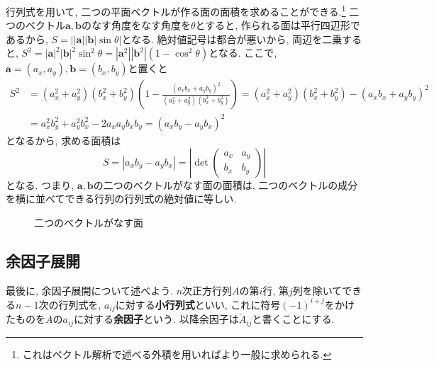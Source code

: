         行列式を用いて, 二つの平面ベクトルが作る面の面積を求めることができる.\footnote{これはベクトル解析で述べる外積を用いればより一般に求められる.} 二つのベクトル$\bm{a},\bm{b}$のなす角度をなす角度を$\theta$とすると, 
        作られる面は平行四辺形であるから, $S=\left||\bm{a}||\bm{b}|\sin\theta\right|$となる. 絶対値記号は都合が悪いから, 両辺を二乗すると,
        $S^2=|\bm{a}|^2|\bm{b}|^2\sin^2\theta=|\bm{a}^2||\bm{b}^2|(1-\cos^2\theta)$となる.
        ここで, $\bm{a}=(a_x,a_y),\bm{b}=(b_x,b_y)$と置くと
        \begin{align*}
            S^2&=(a_x^2+a_y^2)(b_x^2+b_y^2)\left(1-\frac{(a_xb_x+a_yb_y)^2}{(a_x^2+a_y^2)(b_x^2+b_y^2)}\right)=(a_x^2+a_y^2)(b_x^2+b_y^2)-(a_xb_x+a_yb_y)^2\\
            &=a_x^2b_y^2+a_y^2b_x^2-2a_xa_yb_xb_y=(a_xb_y-a_yb_x)^2
        \end{align*}
        となるから, 求める面積は
        \begin{equation}
            S=|a_xb_y-a_yb_x|=\left|\det\begin{pmatrix}
                a_x & a_y \\ b_x & b_y
            \end{pmatrix}\right| \label{eq:線形代数:二つのベクトルがなす面の面積}
        \end{equation}
        となる. つまり, $\bm{a},\bm{b}$の二つのベクトルがなす面の面積は, 二つのベクトルの成分を横に並べてできる行列の行列式の絶対値に等しい.
        \begin{figure}[h]
            \centering
            \caption{二つのベクトルがなす面}
        \end{figure}
    \clearpage
    \subsection{余因子展開}
        最後に, 余因子展開について述べよう. $n$次正方行列$A$の第$i$行, 第$j$列を除いてできる$n-1$次の行列式を, $a_{ij}$に対する\textbf{小行列式}といい, 
        これに符号$(-1)^{i+j}$をかけたものを$A$の$a_{ij}$に対する\textbf{余因子}という. 以降余因子は$\tilde{A}_{ij}$と書くことにする.\\

